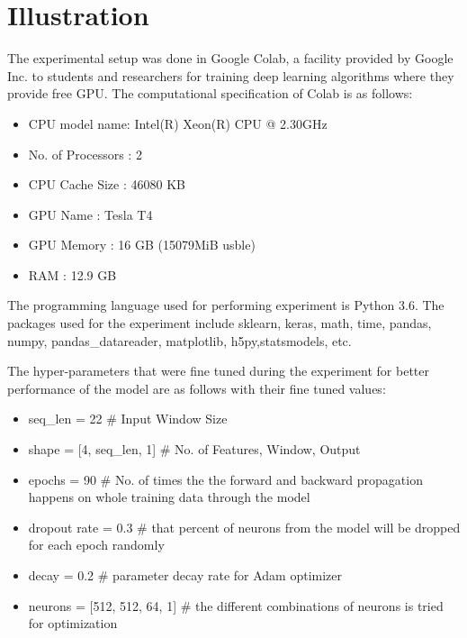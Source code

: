 \section{Illustration}
The experimental setup was done in Google Colab, a facility provided by Google Inc. to students and researchers for training deep learning algorithms where they provide free GPU. The computational specification of Colab is as follows:
\begin{itemize}
\item CPU model name: Intel(R) Xeon(R) CPU @ 2.30GHz  
\item No. of Processors : 2
\item CPU Cache Size : 46080 KB
\item GPU Name : Tesla T4
\item GPU Memory : 16 GB (15079MiB usble)
\item RAM : 12.9 GB
\end{itemize}

The programming language used for performing experiment is Python 3.6. The packages used for the experiment include sklearn, keras, math, time, pandas, numpy, pandas\_datareader, matplotlib, h5py,statsmodels, etc.

The hyper-parameters that were fine tuned during the experiment for better performance of the model are as follows with their fine tuned values:

\begin{itemize}

\item seq\_len = 22		\# Input Window Size

\item shape = [4, seq\_len, 1] 	\# No. of Features, Window, Output

\item epochs = 90 		\# No. of times the the forward and backward propagation happens on whole training data through the model

\item dropout rate = 0.3 		\# that percent of neurons from the model will be dropped for each epoch randomly

\item decay = 0.2 		\# parameter decay rate for Adam optimizer

\item neurons = [512, 512, 64, 1]	\# the different combinations of neurons is tried for optimization


\end{itemize}

